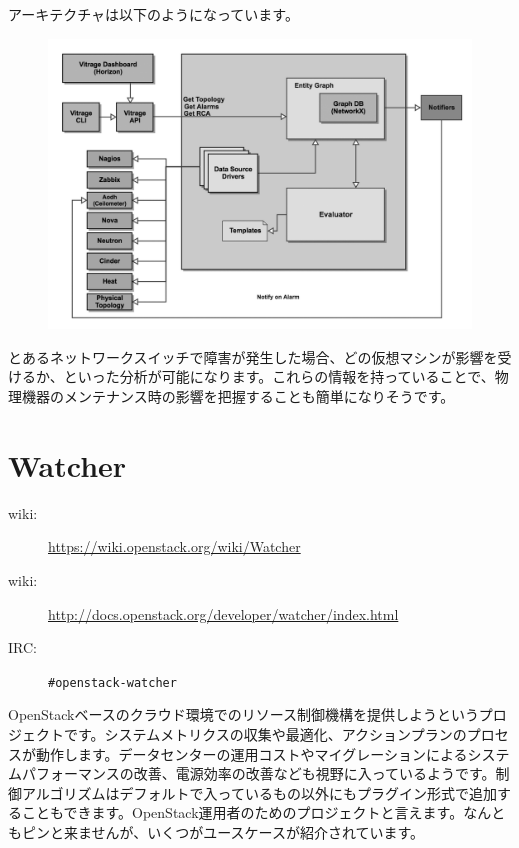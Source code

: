 アーキテクチャは以下のようになっています。

\begin{figure}[htb]
	\begin{center}
		\includegraphics[width=\textwidth]{img/Vitrage-high_level_architecture2.png}
	\end{center}
\end{figure}

とあるネットワークスイッチで障害が発生した場合、どの仮想マシンが影響を受けるか、といった分析が可能になります。これらの情報を持っていることで、物理機器のメンテナンス時の影響を把握することも簡単になりそうです。

\section{Watcher}

\begin{description}
	\item[wiki:] \url{https://wiki.openstack.org/wiki/Watcher}
	\item[wiki:] \url{http://docs.openstack.org/developer/watcher/index.html}
	\item[IRC:] \verb|#openstack-watcher|
\end{description}

OpenStackベースのクラウド環境でのリソース制御機構を提供しようというプロジェクトです。システムメトリクスの収集や最適化、アクションプランのプロセスが動作します。データセンターの運用コストやマイグレーションによるシステムパフォーマンスの改善、電源効率の改善なども視野に入っているようです。制御アルゴリズムはデフォルトで入っているもの以外にもプラグイン形式で追加することもできます。OpenStack運用者のためのプロジェクトと言えます。なんともピンと来ませんが、いくつがユースケースが紹介されています。

